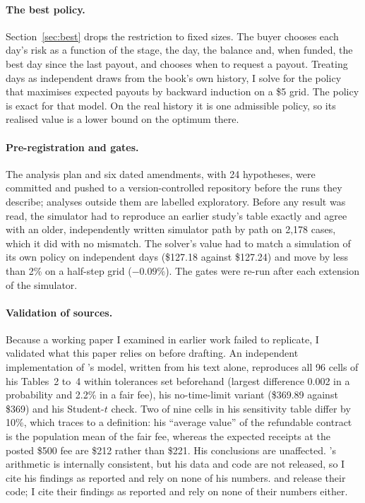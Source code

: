 \documentclass[11pt]{article}
\begin{document}
\paragraph{The best policy.} Section~\ref{sec:best} drops the restriction to fixed sizes. The buyer chooses each
day's risk as a function of the stage, the day, the balance and, when funded, the best day since the last
payout, and chooses when to request a payout. Treating days as independent draws from the book's own history, I
solve for the policy that maximises expected payouts by backward induction on a \$5 grid. The policy is exact
for that model. On the real history it is one admissible policy, so its realised value is a lower bound on the
optimum there.

\paragraph{Pre-registration and gates.} The analysis plan and six dated amendments, with 24 hypotheses, were
committed and pushed to a version-controlled repository before the runs they describe; analyses outside them are
labelled exploratory. Before any result was read, the simulator had to reproduce an earlier study's table exactly
and agree with an older, independently written simulator path by path on 2,178 cases, which it did with no
mismatch. The solver's value had to match a simulation of its own policy on independent days (\$127.18 against
\$127.24) and move by less than 2\% on a half-step grid ($-0.09\%$). The gates were re-run after each extension of
the simulator.

\paragraph{Validation of sources.} Because a working paper I examined in earlier work failed to replicate, I
validated what this paper relies on before drafting. An independent implementation of
\citet{lim2026}'s model, written from his text alone, reproduces all 96 cells of his Tables~2 to~4 within
tolerances set beforehand (largest difference 0.002 in a probability and 2.2\% in a fair fee), his no-time-limit
variant (\$369.89 against \$369) and his Student-$t$ check. Two of nine cells in his sensitivity table differ by
10\%, which traces to a definition: his ``average value'' of the refundable contract is the population mean of
the fair fee, whereas the expected receipts at the posted \$500 fee are \$212 rather than \$221. His conclusions
are unaffected. \citet{villahermosa2026}'s arithmetic is internally consistent, but his data and code are not
released, so I cite his findings as reported and rely on none of his numbers. \citet{youngblood2026} and
\citet{ruether2026} release their code; I cite their findings as reported and rely on none of their numbers either.
\end{document}
